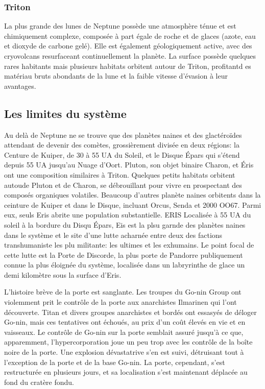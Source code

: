                                                                      \subsubsection{Triton} \label{sec:triton} 

                                                                     La plus grande des lunes de Neptune possède une atmosphère ténue et est chimiquement complexe, composée à part égale de roche et de glaces (azote, eau et dioxyde de carbone gelé). Elle est également géologiquement active, avec des cryovolcans resurfaceant continuellement la planète. La surface possède quelques rares habitants mais plusieurs habitats orbitent autour de Triton, profitantd es matériau bruts abondants de la lune et la faible vitesse d'évasion à leur avantages. 

                                                                     \subsection{Les limites du système} \label{sec:edge-system} 

                                                                     Au delà de Neptune ne se trouve que des planètes naines et des glactéroïdes attendant de devenir des comètes, grossièrement divisée en deux régions: la Centure de Kuiper, de 30 à 55 UA du Soleil, et le Disque Épars qui s'étend depuis 55 UA jusqu'au Nuage d'Oort. Pluton, son objet binaire Charon, et Éris ont une composition similaires à Triton. Quelques petits habitats orbitent autoude Pluton et de Charon, se débrouillant pour vivre en prospectant des composés organiques volatiles. Beaucoup d'autres planète naines orbitents dans la ceinture de Kuiper et dans le Disque, incluant Orcus, Senda et 2000 OO67. Parmi eux, seuls Eris abrite une population substantielle. ERIS Localisée à 55 UA du soleil à la bordure du Disqu Épars, Eis est la plsu garnde des planètes naines dans le système et le site d'une lutte acharnée entre deux des factions transhumaniste les plu militante: les ultimes et les exhumains. Le point focal de cette lutte est la Porte de Discorde, la plus porte de Pandorre publiquement connue la plus éloignée du système, localisée dans un labryrinthe de glace un demi kilomètre sous la surface d'Eris. 

                                                                     L'histoire brève de la porte est sanglante. Les troupes du Go-nin Group ont violemment prit le contrôle de la porte aux anarchistes Ilmarinen qui l'ont découverte. Titan et divers groupes anarchistes et bordés ont essasyés de déloger Go-nin, mais ces tentatives ont échoués, au prix d'un coût élevés en vie et en vaisseaux. Le contrôle de Go-nin sur la porte semblait assuré jusqu'à ce que, apparemment, l'hypercorporation joue un peu trop avec les contrôle de la boîte noire de la porte. Une explosion dévastatrive s'en est suivi, détruisant tout à l'exception de la porte et de la base Go-nin. La porte, cependant, s'est restructurée en plusieurs jours, et sa localisation s'est maintenant déplacée au fond du cratère fondu. 

